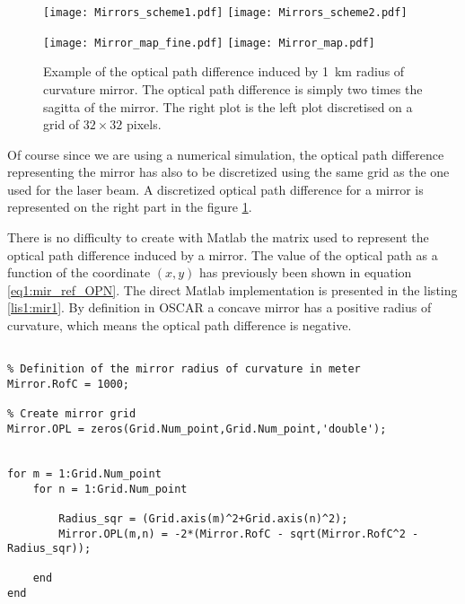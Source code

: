 \begin{figure}
\begin{center}
\texttt{[image: Mirrors\_scheme1.pdf]}\hfill
\texttt{[image: Mirrors\_scheme2.pdf]}\hfill

\vspace*{1cm}

\texttt{[image: Mirror\_map\_fine.pdf]}\hfill
\texttt{[image: Mirror\_map.pdf]}
\end{center}
\caption{\label{fig4:disct_mirror} Example of the optical path difference induced by 1~km radius of curvature mirror. The optical path difference is simply two times the sagitta of the mirror. The right plot is the left plot discretised on a grid of $32 \times 32$ pixels.}
\end{figure}

Of course since we are using a numerical simulation, the optical path difference representing the mirror has also to be discretized using the same grid as the one used for the laser beam. A discretized optical path difference for a mirror is represented on the right part in the figure \ref{fig4:disct_mirror}.

There is no difficulty to create with Matlab the matrix used to represent the optical path difference induced by a mirror. The value of the optical path as a function of the coordinate $(x,y)$ has previously been shown in equation \ref{eq1:mir_ref_OPN}. The direct Matlab implementation is presented in the listing \ref{lis1:mir1}. By definition in OSCAR a concave mirror has a positive radius of curvature, which means the optical path difference is negative.\\

\begin{lstlisting}[float=htp,caption=The code used to create the mirror matrix \label{lis1:mir1},frame=lines]

% Definition of the mirror radius of curvature in meter
Mirror.RofC = 1000;

% Create mirror grid
Mirror.OPL = zeros(Grid.Num_point,Grid.Num_point,'double');


for m = 1:Grid.Num_point
    for n = 1:Grid.Num_point

        Radius_sqr = (Grid.axis(m)^2+Grid.axis(n)^2);
        Mirror.OPL(m,n) = -2*(Mirror.RofC - sqrt(Mirror.RofC^2 - Radius_sqr));

    end
end
\end{lstlisting}

